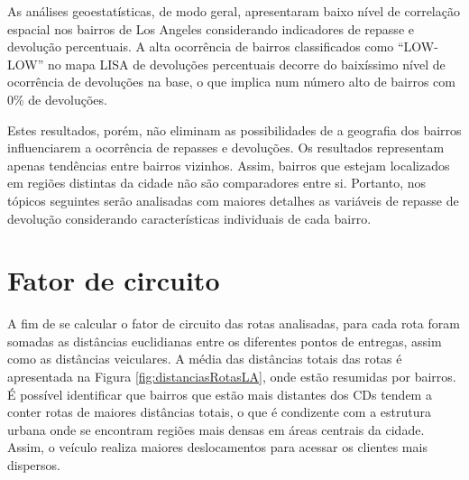 As análises geoestatísticas, de modo geral, apresentaram baixo nível de correlação espacial nos bairros de Los Angeles considerando indicadores de repasse e devolução percentuais. 
A alta ocorrência de bairros classificados como ``LOW-LOW'' no mapa LISA de devoluções percentuais decorre do baixíssimo nível de ocorrência de devoluções na base, o que implica num número alto de bairros com 0\% de devoluções. 

Estes resultados, porém, não eliminam as possibilidades de a geografia dos bairros influenciarem a ocorrência de repasses e devoluções. 
Os resultados representam apenas tendências entre bairros vizinhos. 
Assim, bairros que estejam localizados em regiões distintas da cidade não são comparadores entre si. 
Portanto, nos tópicos seguintes serão analisadas com maiores detalhes as variáveis de repasse de devolução considerando características individuais de cada bairro.

\section{Fator de circuito} \label{sec:Amazon_FC}

A fim de se calcular o fator de circuito das rotas analisadas, para cada rota foram somadas as distâncias euclidianas entre os diferentes pontos de entregas, assim como as distâncias veiculares.
A média das distâncias totais das rotas é apresentada na Figura \ref{fig:distanciasRotasLA}, onde estão resumidas por bairros.
É possível identificar que bairros que estão mais distantes dos CDs tendem a conter rotas de maiores distâncias totais, o que é condizente com a estrutura urbana onde se encontram regiões mais densas em áreas centrais da cidade. 
Assim, o veículo realiza maiores deslocamentos para acessar os clientes mais dispersos.

